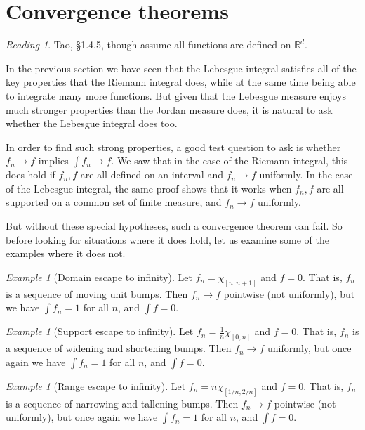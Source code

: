 \documentclass[11pt,oneside]{amsbook}
\newcommand{\RR}{{\mathbb R}}
\theoremstyle{definition}
\theoremstyle{plain}
\theoremstyle{definition}
\theoremstyle{remark}
\newtheorem{example}[thm]{Example}
\newtheorem*{reading}{Reading}
\numberwithin{equation}{section}
\numberwithin{figure}{section}
\begin{document}
\section{Convergence theorems}

\begin{reading}
  Tao, \S 1.4.5, though assume all functions are defined on $\RR^d$.
\end{reading}

In the previous section we have seen that the Lebesgue integral satisfies all of the key properties that the Riemann integral does, while at the same time being able to integrate many more functions. But given that the Lebesgue measure enjoys much stronger properties than the Jordan measure does, it is natural to ask whether the Lebesgue integral does too.

In order to find such strong properties, a good test question to ask is whether $f_n\to f$ implies $\int f_n\to f$. We saw that in the case of the Riemann integral, this does hold if $f_n,f$ are all defined on an interval and $f_n\to f$ uniformly. In the case of the Lebesgue integral, the same proof shows that it works when $f_n,f$ are all supported on a common set of finite measure, and $f_n\to f$ uniformly.

But without these special hypotheses, such a convergence theorem can fail. So before looking for situations where it does hold, let us examine some of the examples where it does not.

\begin{example}[Domain escape to infinity]
  Let $f_n=\chi_{[n,n+1]}$ and $f=0$. That is, $f_n$ is a sequence of moving unit bumps. Then $f_n\to f$ pointwise (not uniformly), but we have $\int f_n=1$ for all $n$, and $\int f=0$.
\end{example}

\begin{example}[Support escape to infinity]
  Let $f_n=\frac1n\chi_{[0,n]}$ and $f=0$. That is, $f_n$ is a sequence of widening and shortening bumps. Then $f_n\to f$ uniformly, but once again we have $\int f_n=1$ for all $n$, and $\int f=0$.
\end{example}

\begin{example}[Range escape to infinity]
  Let $f_n=n\chi_{[1/n,2/n]}$ and $f=0$. That is, $f_n$ is a sequence of narrowing and tallening bumps. Then $f_n\to f$ pointwise (not uniformly), but once again we have $\int f_n=1$ for all $n$, and $\int f=0$.
\end{example}
\end{document}
